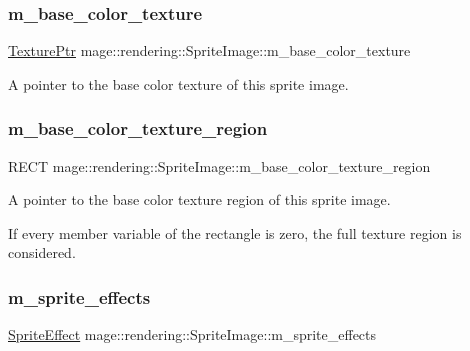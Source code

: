 \subsubsection{\texorpdfstring{m\+\_\+base\+\_\+color\+\_\+texture}{m\_base\_color\_texture}}
{\footnotesize\ttfamily \mbox{\hyperlink{namespacemage_1_1rendering_a6f3ae54f825328465b0cdde0f0de4a36}{Texture\+Ptr}} mage\+::rendering\+::\+Sprite\+Image\+::m\+\_\+base\+\_\+color\+\_\+texture\hspace{0.3cm}{\ttfamily [private]}}

A pointer to the base color texture of this sprite image. \mbox{\label{classmage_1_1rendering_1_1_sprite_image_a18de0a4473e2bfee074cd152d1ba2c3e}} 
\subsubsection{\texorpdfstring{m\+\_\+base\+\_\+color\+\_\+texture\+\_\+region}{m\_base\_color\_texture\_region}}
{\footnotesize\ttfamily R\+E\+CT mage\+::rendering\+::\+Sprite\+Image\+::m\+\_\+base\+\_\+color\+\_\+texture\+\_\+region\hspace{0.3cm}{\ttfamily [private]}}

A pointer to the base color texture region of this sprite image.

If every member variable of the rectangle is zero, the full texture region is considered. \mbox{\label{classmage_1_1rendering_1_1_sprite_image_a25891d2cfd1edd3dc86c0bc82700cad2}} 
\subsubsection{\texorpdfstring{m\+\_\+sprite\+\_\+effects}{m\_sprite\_effects}}
{\footnotesize\ttfamily \mbox{\hyperlink{namespacemage_1_1rendering_a4dbc3536c87b906f1d41d863ec458e78}{Sprite\+Effect}} mage\+::rendering\+::\+Sprite\+Image\+::m\+\_\+sprite\+\_\+effects\hspace{0.3cm}{\ttfamily [private]}}

